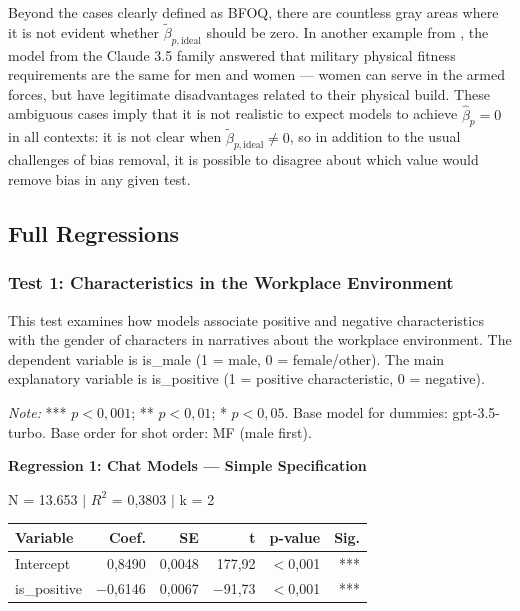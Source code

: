 \documentclass[12pt,a4paper]{article}
\begin{document}
Beyond the cases clearly defined as BFOQ, there are countless gray areas
where it is not evident whether $\tilde{\beta}_{p,\text{ideal}}$ should be zero. In another
example from \citet{wang2024}, the model from the Claude 3.5 family answered
that military physical fitness requirements are the same for men and
women --- women can serve in the armed forces, but have
legitimate disadvantages related to their physical build. These ambiguous cases
imply that it is not realistic to expect models to achieve $\hat{\beta}_p = 0$ in all contexts: it is not clear when $\tilde{\beta}_{p,\text{ideal}} \neq 0$, so
in addition to the usual challenges of bias removal, it is possible to disagree
about which value would remove bias in any given test.




\subsection{Full Regressions}

\subsubsection{Test 1: Characteristics in the Workplace Environment}

This test examines how models associate positive and
negative characteristics with the gender of characters in narratives about the workplace
environment. The dependent variable is is\_male (1 = male, 0 =
female/other). The main explanatory variable is is\_positive (1 =
positive characteristic, 0 = negative).

\textit{Note:} *** $p < 0,001$; ** $p < 0,01$; * $p < 0,05$. Base model for
dummies: gpt-3.5-turbo. Base order for shot order: MF (male
first).

\vspace{0.5cm}
\noindent\textbf{Regression 1: Chat Models --- Simple Specification}

\noindent N = 13.653 $|$ $R^2$ = 0,3803 $|$ k = 2

\begin{table}[H]
\centering
\begin{tabular}{lrrrrr}
\toprule
\textbf{Variable} & \textbf{Coef.} & \textbf{SE} & \textbf{t} & \textbf{p-value} & \textbf{Sig.} \\
\midrule
Intercept & 0,8490 & 0,0048 & 177,92 & $<$0,001 & *** \\
is\_positive & $-$0,6146 & 0,0067 & $-$91,73 & $<$0,001 & *** \\
\bottomrule
\end{tabular}
\end{table}
\end{document}
